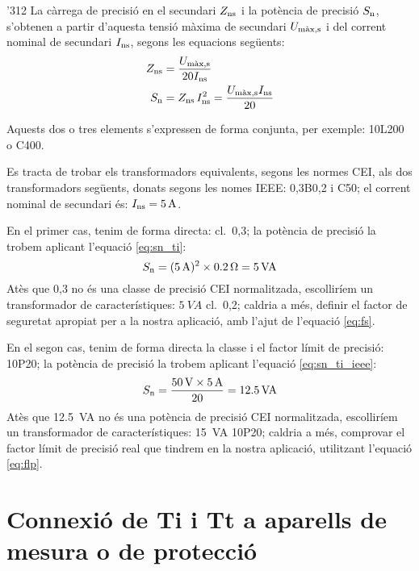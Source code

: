 \begin{dingautolist}{'312}
    La càrrega de precisió en el secundari
    $Z_\mathrm{ns}$ i la potència de precisió $S_\mathrm{n}$, s'obtenen a partir d'aquesta
    tensió màxima de secundari $U_\mathrm{m\grave{a}x,s}$
    i del corrent     nominal de secundari $I_\mathrm{ns}$, segons les equacions següents:
    \begin{align}
        Z_\mathrm{ns} &= \frac{U_\mathrm{m\grave{a}x,s}}{20 I_\mathrm{ns}}\\
        S_\mathrm{n} &= Z_\mathrm{ns} \,I_\mathrm{ns}^2 = \frac{U_\mathrm{m\grave{a}x,s} I_\mathrm{ns}}{20}
        \label{eq:sn_ti_ieee}
    \end{align}
\end{dingautolist}

Aquests dos o tres elements s'expressen de forma conjunta, per exemple:
10L200 o C400.

\begin{exemple}
    Es tracta de trobar els transformadors equivalents, segons les normes CEI, als dos
    transformadors següents, donats segons les nomes IEEE: 0,3B0,2 i
    C50; el corrent nominal de secundari és:    $I_\mathrm{ns}=\SI{5}{A}$.

    En el primer cas, tenim de forma directa: cl.~0,3; la potència de precisió la trobem
    aplicant l'equació \eqref{eq:sn_ti}:
    \[
        S_\mathrm{n} =(\SI{5}{A})^2 \times \SI{0,2}{\ohm} =  \SI{5}{VA}
    \]
    Atès que 0,3 no és una classe de precisió CEI normalitzada,
    escolliríem un transformador de característiques: $\SI{5}{VA}$ cl.~0,2; caldria a més, definir el factor de
    seguretat apropiat per a la nostra aplicació, amb l'ajut de l'equació \eqref{eq:fs}.

    En el segon cas, tenim de forma directa la classe i el factor límit de
    precisió: 10P20; la potència de precisió la trobem
    aplicant l'equació \eqref{eq:sn_ti_ieee}:
    \[
        S_\mathrm{n} = \frac{\SI{50}{V} \times\SI{5}{A}}{20} = \SI{12,5}{VA}
    \]
    Atès que \SI{12,5}{VA} no és una potència de precisió CEI normalitzada,
     escolliríem un transformador de característiques:
    \SI{15}{VA} 10P20; caldria a més, comprovar el factor límit de precisió real
    que tindrem en la nostra aplicació, utilitzant l'equació \eqref{eq:flp}.
\end{exemple}

\section{Connexió de Ti i Tt a aparells de mesura o de
protecció}\label{sec:conex_ti_tt}

